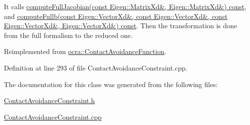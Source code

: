 It calls \hyperlink{classocra_1_1ContactAvoidanceFunction_a8a9b3979fd9fde89c2bc7c9fc72dd8b8}{compute\+Full\+Jacobian(const Eigen\+::\+Matrix\+Xd\&, Eigen\+::\+Matrix\+Xd\&) const}, and \hyperlink{classocra_1_1ContactAvoidanceFunction_a726154874ea2841eedbb115474e71014}{compute\+Fullb(const Eigen\+::\+Vector\+Xd\&, const Eigen\+::\+Vector\+Xd\&, const Eigen\+::\+Vector\+Xd\&, Eigen\+::\+Vector\+Xd\&) const}. Then the transformation is done from the full formalism to the reduced one. 

Reimplemented from \hyperlink{classocra_1_1ContactAvoidanceFunction_a855a318b47bb7ac163cc482ba24fe6f9}{ocra\+::\+Contact\+Avoidance\+Function}.



Definition at line 293 of file Contact\+Avoidance\+Constraint.\+cpp.



The documentation for this class was generated from the following files\+:\begin{DoxyCompactItemize}
\item 
\hyperlink{ContactAvoidanceConstraint_8h}{Contact\+Avoidance\+Constraint.\+h}\item 
\hyperlink{ContactAvoidanceConstraint_8cpp}{Contact\+Avoidance\+Constraint.\+cpp}\end{DoxyCompactItemize}
